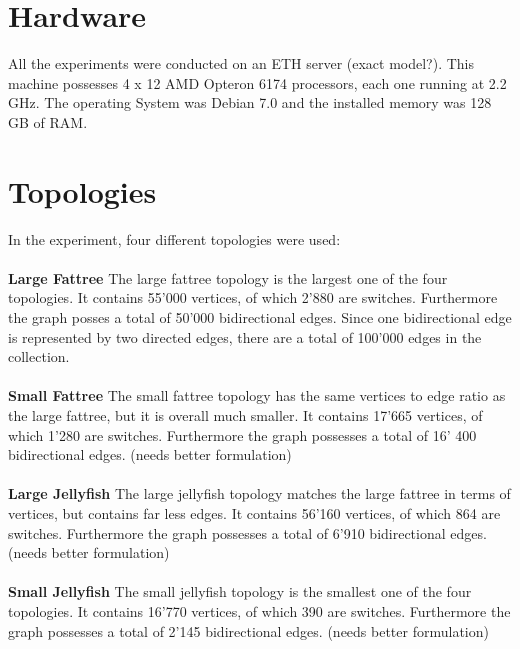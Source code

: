\documentclass[11pt,singlecolumn]{scrartcl}
\begin{document}
\section{Hardware}
All the experiments were conducted on an ETH server (exact model?). This machine possesses 4 x 12 AMD Opteron 6174 processors, each one running at 2.2 GHz. The operating System was Debian 7.0 and the installed memory was 128 GB of RAM.
\section{Topologies}
In the experiment, four different topologies were used:\\\\
\textbf{Large Fattree} \quad  The large fattree topology is the largest one of the four topologies. It contains 55'000 vertices, of which 2'880 are switches. Furthermore the graph posses a total of 50'000 bidirectional edges. Since one bidirectional edge is represented by two directed edges, there are a total of 100'000 edges in the collection.\\\\
\textbf{Small Fattree} \quad The small fattree topology has the same vertices to edge ratio as the large fattree, but it is overall much smaller. It contains 17'665 vertices, of which 1'280 are switches. Furthermore the graph possesses a total of 16' 400 bidirectional edges. (needs better formulation) \\\\
\textbf{Large Jellyfish} \quad  The large jellyfish topology matches the large fattree in terms of vertices, but contains far less edges. It contains 56'160 vertices, of which 864 are switches. Furthermore the graph possesses a total of 6'910 bidirectional edges. (needs better formulation)\\\\
\textbf{Small Jellyfish} \quad The small jellyfish topology is the smallest one of the four topologies. It contains 16'770 vertices, of which 390 are switches. Furthermore the graph possesses a total of 2'145 bidirectional edges. (needs better formulation)
\end{document}
